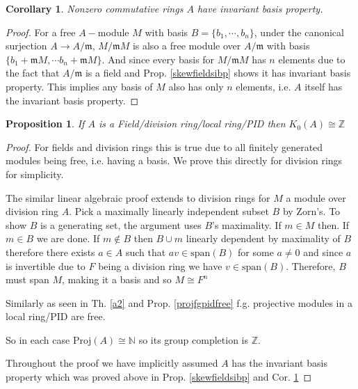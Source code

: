 \documentclass[12pt]{article}
\numberwithin{equation}{section}
\newcommand{\Z}{\mathbb{Z}}
\newcommand{\N}{\mathbb{N}}
\newcounter{dummy} \numberwithin{dummy}{section}
\newtheorem{corollary}[dummy]{Corollary}
\newtheorem{proposition}[dummy]{Proposition}
\begin{document}
	\begin{corollary}\label{comringibp}
		Nonzero commutative rings $A$ have invariant basis property.
	\end{corollary}
	\begin{proof}
		For a free $A-$module $M $ with basis $B=\{b_1, \cdots, b_n\}$, under the canonical surjection $A \to A/\mathfrak{m}$, $M/\mathfrak{m}M$ is also a free module over $A/\mathfrak{m}$ with basis $\{b_1+\mathfrak{m} M, \cdots b_n + \mathfrak{m}M\}$. And since every basis for $M/\mathfrak{m}M$ has $n$ elements due to the fact that $A/\mathfrak{m}$ is a field and Prop. \ref{skewfieldsibp} shows it has invariant basis property. This implies any basis of $M$ also has only $n$ elements, i.e. $A$ itself has the invariant basis property.
	\end{proof}
	\begin{proposition}\label{k0pidisZ}
	If $A$ is a Field/division ring/local ring/PID then $K_0(A)\cong\Z$
	\end{proposition}
	\begin{proof}
		For fields and division rings this is true due to all finitely generated modules being free, i.e. having a basis. We prove this directly for division rings for simplicity.
		
		The similar linear algebraic proof extends to division rings for $M$ a module over division ring $A$. Pick a maximally linearly independent subset $B$ by Zorn's. To show \( B \) is a generating set, the argument uses \( B \)'s maximality. If \( m \in M \) then. If $m \in B$ we are done. If $m \not \in B$ then $B \cup {m}$ linearly dependent by maximality of $B$ therefore there exists $a\in A$ such that $av \in \mathrm{span}(B)$ for some $a \neq 0$ and since $a $ is invertible due to $F$ being a division ring we have $v \in \mathrm{span}(B)$.
		Therefore, \( B \) must span \( M \), making it a basis and so $ M \cong F^n$
		
		Similarly as seen in Th. \ref{a2} and  Prop. \ref{projfgpidfree} f.g. projective modules in a local ring/PID are free.
		
		So in each case $\mathrm{Proj}(A) \cong \N$ so its group completion is $\Z.$ 
		
		Throughout the proof we have implicitly assumed $A$ has the invariant basis property which was proved above in Prop. \ref{skewfieldsibp} and Cor. \ref{comringibp}
		\end{proof}
		
\end{document}
